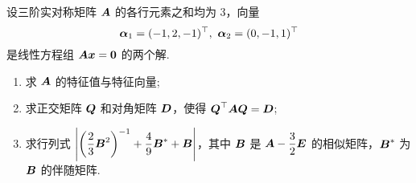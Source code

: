 \begin{example}[2010 武汉大学]
    设三阶实对称矩阵 $\vb*{A}$ 的各行元素之和均为 3，向量
    $$\vb*{\alpha}_1=(-1,2,-1)^{\top},~\vb*{\alpha}_2=(0,-1,1)^{\top}$$ 是线性方程组 $\vb*{Ax}=\vb*{0}$ 的两个解.
    \begin{enumerate}[label=(\arabic{*})]
        \item 求 $\vb*{A}$ 的特征值与特征向量;
        \item 求正交矩阵 $\vb*{Q}$ 和对角矩阵 $\vb*{D}$，使得 $\vb*{Q}^{\top}\vb*{AQ}=\vb*{D}$;
        \item 求行列式 $\qty|\qty(\dfrac{2}{3}\vb*{B}^2)^{-1}+\dfrac{4}{9}\vb*{B}^*+\vb*{B}|$，其中 $\vb*{B}$ 是 $\vb*{A}-\dfrac{3}{2}\vb*{E}$ 的相似矩阵，$\vb*{B}^*$ 为 $\vb*{B}$ 的伴随矩阵.
    \end{enumerate}
\end{example}
